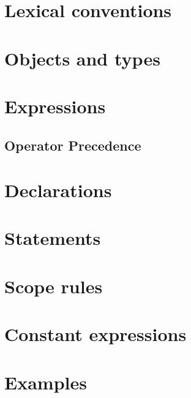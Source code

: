 
\section{Lexical conventions}


\section{Objects and types}

\section{Expressions}
\subsection{Operator Precedence}

\section{Declarations}

\section{Statements}

\section{Scope rules}

\section{Constant expressions}

\section{Examples}

